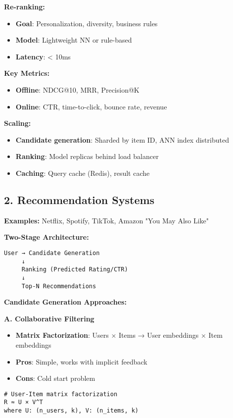 \documentclass[8pt,landscape]{article}
\begin{document}
\begin{multicols}{3}
\textbf{Re-ranking:}
\begin{itemize}
\item \textbf{Goal}: Personalization, diversity, business rules
\item \textbf{Model}: Lightweight NN or rule-based
\item \textbf{Latency}: < 10ms
\end{itemize}

\textbf{Key Metrics:}
\begin{itemize}
\item \textbf{Offline}: NDCG@10, MRR, Precision@K
\item \textbf{Online}: CTR, time-to-click, bounce rate, revenue
\end{itemize}

\textbf{Scaling:}
\begin{itemize}
\item \textbf{Candidate generation}: Sharded by item ID, ANN index distributed
\item \textbf{Ranking}: Model replicas behind load balancer
\item \textbf{Caching}: Query cache (Redis), result cache
\end{itemize}

\subsection*{2. Recommendation Systems}
\textbf{Examples:} Netflix, Spotify, TikTok, Amazon "You May Also Like"

\textbf{Two-Stage Architecture:}
\begin{verbatim}
User → Candidate Generation
     ↓
     Ranking (Predicted Rating/CTR)
     ↓
     Top-N Recommendations
\end{verbatim}

\textbf{Candidate Generation Approaches:}

\textbf{A. Collaborative Filtering}
\begin{itemize}
\item \textbf{Matrix Factorization}: Users × Items → User embeddings × Item embeddings
\item \textbf{Pros}: Simple, works with implicit feedback
\item \textbf{Cons}: Cold start problem
\end{itemize}
\begin{verbatim}
# User-Item matrix factorization
R ≈ U × V^T
where U: (n_users, k), V: (n_items, k)


\end{verbatim}
\end{multicols}
\end{document}
